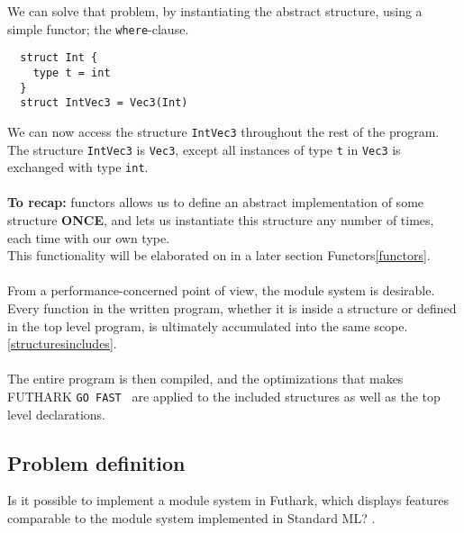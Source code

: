 \noindent
We can solve that problem, by instantiating the abstract structure, using a
simple functor; the \texttt{where}-clause.
\label{first_functor_example}
\begin{verbatim}
  struct Int {
    type t = int 
  }
  struct IntVec3 = Vec3(Int)
\end{verbatim}
\noindent
We can now access the structure \texttt{IntVec3} throughout the rest of the
program.
\\
The structure \texttt{IntVec3} is \texttt{Vec3}, except all instances
of type \texttt{t} in \texttt{Vec3} is exchanged with type \texttt{int}.
\\
\\
\textbf{To recap:} functors allows us to define an abstract implementation of some
structure \textbf{ONCE}, and lets us instantiate this structure any number of
times, each time with our own type.
\\
This functionality will be elaborated on in a later section Functors\ref{functors}. 
\\
\\
From a performance-concerned point of view, the module system is desirable.
Every function in the written program, whether it is inside a structure
or defined in the top level program, is ultimately accumulated into the same
scope. \ref{structuresincludes}.
\\
\\
The entire program is then compiled, and the optimizations that makes FUTHARK \texttt{GO
FAST } are applied to the included structures as well as the top level declarations.

\subsection{Problem definition}
\label{subsec:probdef}
Is it possible to implement a module system in Futhark, which displays features
comparable to the module system implemented in Standard ML? \cite{crash_course}.

